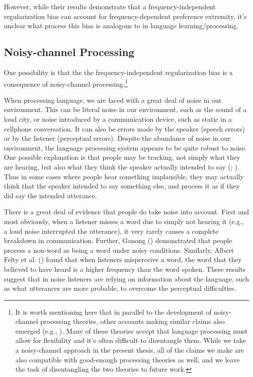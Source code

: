 \documentclass[
  12pt,
]{scrartcl}
\begin{document}
However, while their results demonstrate that a frequency-independent
regularization bias can account for frequency-dependent preference
extremity, it's unclear what process this bias is analogous to in
language learning/processing.

\subsection{Noisy-channel Processing}\label{noisy-channel-processing}

One possibility is that the the frequency-independent regularization
bias is a consequence of noisy-channel processing.\footnote{It is worth
  mentioning here that in parallel to the development of noisy-channel
  processing theories, other accounts making similar claims also emerged
  (e.g., ). Many of these theories accept that language processing
  must allow for flexibility and it's often difficult to disentangle
  them. While we take a noisy-channel approach in the present thesis,
  all of the claims we make are also compatible with good-enough
  processing theories as well, and we leave the task of disentangling
  the two theories to future work.}

When processing language, we are faced with a great deal of noise in our
environment. This can be literal noise in our environment, such as the
sound of a loud city, or noise introduced by a communication device,
such as static in a cellphone conversation. It can also be errors made
by the speaker (speech errors) or by the listener (perceptual errors).
Despite the abundance of noise in our environment, the language
processing system appears to be quite robust to noise. One possible
explanation is that people may be tracking, not simply what they are
hearing, but also what they think the speaker actually intended to say
(; ).
Thus in some cases where people hear something implausible, they may
actually think that the speaker intended to say something else, and
process it as if they did say the intended utterance.

There is a great deal of evidence that people do take noise into
account. First and most obviously, when a listener misses a word due to
simply not hearing it (e.g., a loud noise interrupted the utterance), it
very rarely causes a complete breakdown in communication. Further,
Ganong ()
demonstrated that people process a non-word as being a word under noisy
conditions. Similarly, Albert Felty et al.
() found that when
listeners misperceive a word, the word that they believed to have heard
is a higher frequency than the word spoken. These results suggest that
in noise listeners are relying on information about the language, such
as what utterances are more probable, to overcome the perceptual
difficulties.
\end{document}
